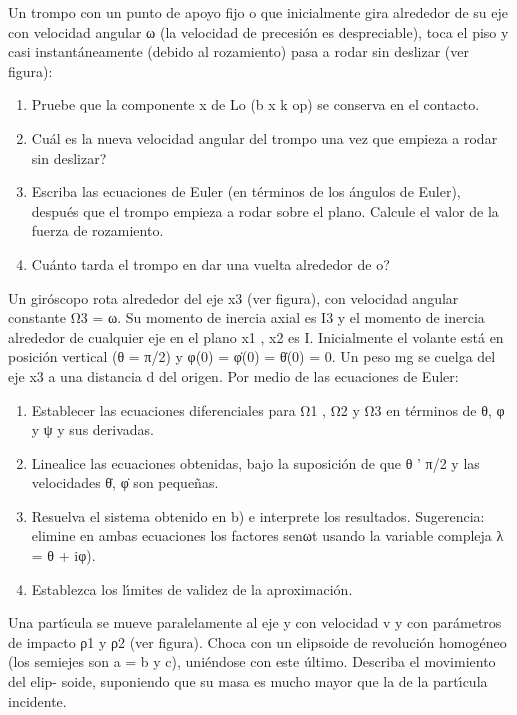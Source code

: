 \documentclass[10pt,oneside]{CBFT_book}
\begin{document}
\begin{ejercicios}
\label{ej15}
\item{ \bf }
Un trompo con un punto de apoyo fijo o que inicialmente gira alrededor de su eje
con velocidad angular ω (la velocidad de precesión es despreciable), toca el piso y casi
instantáneamente (debido al rozamiento) pasa a rodar sin deslizar (ver figura):
\begin{enumerate}[label=(\alph*)]
\item Pruebe que la componente x de Lo (b x k op) se conserva en el contacto.
\item Cuál es la nueva velocidad angular del trompo una vez que empieza a rodar sin
deslizar?
\item Escriba las ecuaciones de Euler (en términos de los ángulos de Euler), después
que el trompo empieza a rodar sobre el plano. Calcule el valor de la fuerza de
rozamiento.
\item Cuánto tarda el trompo en dar una vuelta alrededor de o?
\end{enumerate}

\label{ej16}
\item{ \bf }
Un giróscopo rota alrededor del eje x3 (ver figura), con velocidad angular constante
Ω3 = ω. Su momento de inercia axial es I3 y el momento de inercia alrededor de
cualquier eje en el plano x1 , x2 es I. Inicialmente el volante está en posición vertical
(θ = π/2) y φ(0) = φ̇(0) = θ̇(0) = 0. Un peso mg se cuelga del eje x3 a una distancia
d del origen. Por medio de las ecuaciones de Euler:
\begin{enumerate}[label=(\alph*)]
\item Establecer las ecuaciones diferenciales para Ω1 , Ω2 y Ω3 en términos de θ, φ y ψ
y sus derivadas.
\item Linealice las ecuaciones obtenidas, bajo la suposición de que θ ' π/2 y las
velocidades θ̇, φ̇ son pequeñas.
\item Resuelva el sistema obtenido en b) e interprete los resultados. Sugerencia:
elimine en ambas ecuaciones los factores senωt usando la variable compleja
λ = θ + iφ).
\item Establezca los lı́mites de validez de la aproximación.
\end{enumerate}

\label{ej17}
\item{ \bf }
Una partı́cula se mueve paralelamente al eje y con velocidad v y con parámetros de impacto ρ1 y ρ2 (ver figura). Choca con un elipsoide de revolución homogéneo (los semiejes son a = b y c), uniéndose con este último. Describa el movimiento del elip- soide, suponiendo que su masa es mucho mayor que la de la partı́cula incidente.


\end{ejercicios}
\end{document}
